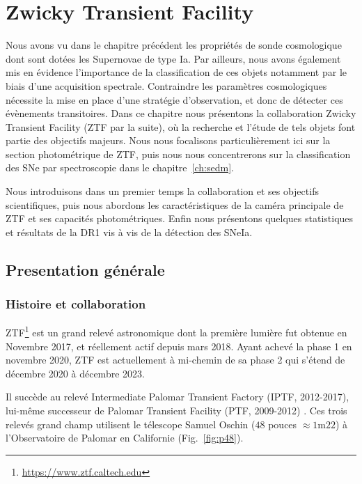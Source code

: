 \documentclass[../main/main.tex]{subfiles}
\begin{document}
\setcounter{chapter}{2}
\chapter{Zwicky Transient Facility}\label{ch:ztf}

\minitoc
\vspace{2cm}
Nous avons vu dans le chapitre précédent les propriétés
de sonde
cosmologique dont sont dotées les Supernovae de type Ia. Par
ailleurs, nous avons également mis en évidence l'importance de la
classification de ces objets notamment par le biais d'une acquisition
spectrale. Contraindre les paramètres cosmologiques nécessite la mise en
place d'une stratégie d'observation, et donc de
détecter ces évènements transitoires. Dans ce chapitre nous présentons
la collaboration Zwicky Transient Facility (ZTF par la suite), où la recherche et
l'étude de tels objets font partie des objectifs majeurs. Nous nous
focalisons particulièrement ici sur la section photométrique de
ZTF, puis nous nous concentrerons sur la classification des SNe par
spectroscopie dans le chapitre~\ref{ch:sedm}.

Nous introduisons dans un premier temps la collaboration et ses objectifs
scientifiques, puis nous abordons les caractéristiques de la caméra principale de ZTF et ses capacités
photométriques. Enfin nous présentons quelques statistiques et résultats
de la DR1 vis à vis de la détection des SNeIa.
\newpage
\section{Presentation générale}
\label{sec:ztfcollab}


\subsection{Histoire et collaboration}

ZTF\footnote{\url{https://www.ztf.caltech.edu}} \citep{GrahamZTF2019,BellmZTF2019}  est un grand relevé astronomique dont la première lumière fut
obtenue en Novembre 2017, et réellement actif depuis mars
2018. Ayant achevé la phase 1 en novembre 2020, ZTF est actuellement à
mi-chemin de sa phase 2 qui s'étend de décembre 2020 à décembre 2023.

Il succède au relevé Intermediate Palomar Transient Factory (IPTF, 2012-2017),
lui-même successeur de Palomar Transient Facility (PTF, 2009-2012)
\citep{RauPTF2009,LawPTF2009}. Ces trois relevés grand
champ utilisent le télescope Samuel
Oschin ($48$ pouces $\approx 1\text{m}22$) à l'Observatoire de Palomar en
Californie (Fig.~\ref{fig:p48}).
\end{document}
